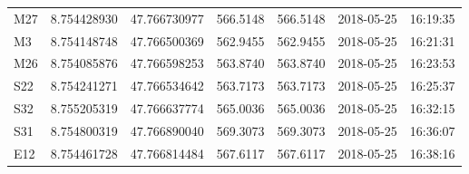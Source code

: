 \begin{table}[!ht]
\begin{tabular}{lllllll}
M27     & 8.754428930 & 47.766730977 & 566.5148 & 566.5148 & 2018-05-25 & 16:19:35 \\
M3      & 8.754148748 & 47.766500369 & 562.9455 & 562.9455 & 2018-05-25 & 16:21:31 \\
M26     & 8.754085876 & 47.766598253 & 563.8740 & 563.8740 & 2018-05-25 & 16:23:53 \\
S22     & 8.754241271 & 47.766534642 & 563.7173 & 563.7173 & 2018-05-25 & 16:25:37 \\
S32     & 8.755205319 & 47.766637774 & 565.0036 & 565.0036 & 2018-05-25 & 16:32:15 \\
S31     & 8.754800319 & 47.766890040 & 569.3073 & 569.3073 & 2018-05-25 & 16:36:07 \\
E12     & 8.754461728 & 47.766814484 & 567.6117 & 567.6117 & 2018-05-25 & 16:38:16 \\
\bottomrule
\end{tabular}
\end{table}